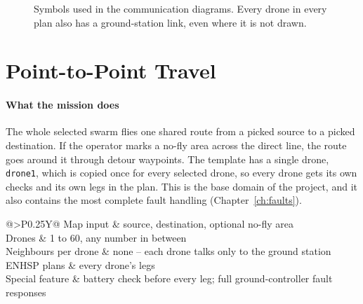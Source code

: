 \documentclass[11pt,a4paper,oneside]{report}
\makeatletter
\newcommand{\maxTravel}{60}
\newcommand{\code}[1]{\texttt{#1}}
\newcommand{\glancebox}[2]{%
  \begin{tcolorbox}[enhanced,colback=softblue!45,colframe=navy,coltitle=white,
      fonttitle=\bfseries\small,title={#1},boxrule=0.6pt,arc=2pt,
      left=6pt,right=6pt,top=3pt,bottom=3pt,before skip=8pt,after skip=10pt]
    \small\setstretch{1.1}%
    \begin{tabularx}{\linewidth}{@{}>{\bfseries}P{0.25\linewidth}Y@{}}#2\end{tabularx}
  \end{tcolorbox}}
\makeatother
\begin{document}
\begin{figure}[H]
\centering
{}
\caption[Symbols used in the communication diagrams]{Symbols used in the communication diagrams.
Every drone in every plan also has a ground-station link, even where it is not drawn.}
\label{fig:legend}
\end{figure}

\section{Point-to-Point Travel}\label{sec:plan-travel}
\paragraph{What the mission does}
The whole selected swarm flies one shared route from a picked source to a picked destination.
If the operator marks a no-fly area across the direct line, the route goes around it through
detour waypoints. The template has a single drone, \code{drone1}, which is copied once for every
selected drone, so every drone gets its own checks and its own legs in the plan. This is the base
domain of the project, and it also contains the most complete fault handling
(Chapter~\ref{ch:faults}).

\glancebox{At a glance: point-to-point travel}{
Map input & source, destination, optional no-fly area \\
Drones & 1 to \maxTravel{}, any number in between \\
Neighbours per drone & none -- each drone talks only to the ground station \\
ENHSP plans & every drone's legs \\
Special feature & battery check before every leg; full ground-controller fault responses \\}
\end{document}
